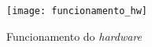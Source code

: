 \begin{figure}
	\centering
	\texttt{[image: funcionamento\_hw]}
	\caption{Funcionamento do \textit{hardware}}
	\label{fig:func_hw}
\end{figure}







